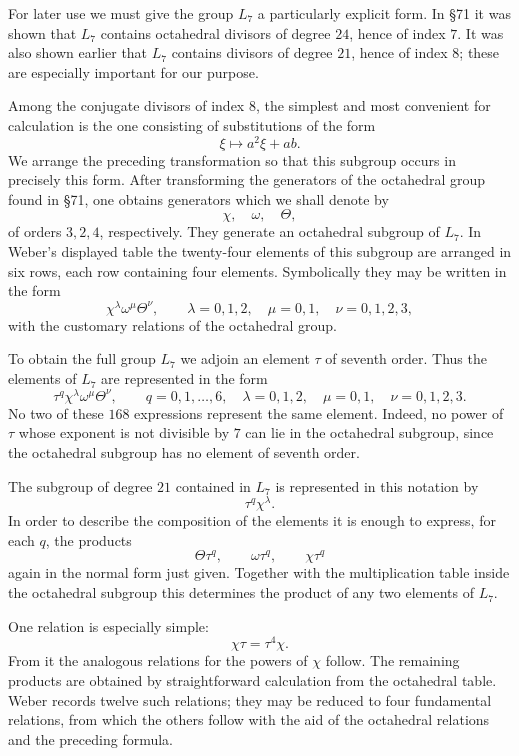 \documentclass[12pt,a4paper]{article}
\begin{document}
For later use we must give the group \(L_7\) a particularly explicit form.  In \S 71 it was shown that \(L_7\) contains octahedral divisors of degree \(24\), hence of index \(7\).  It was also shown earlier that \(L_7\) contains divisors of degree \(21\), hence of index \(8\); these are especially important for our purpose.

Among the conjugate divisors of index \(8\), the simplest and most convenient for calculation is the one consisting of substitutions of the form
\[
 \xi\longmapsto a^2\xi+ab .
\]
We arrange the preceding transformation so that this subgroup occurs in precisely this form.  After transforming the generators of the octahedral group found in \S 71, one obtains generators which we shall denote by
\[
 \chi,\quad \omega,\quad \Theta,
\]
of orders \(3,2,4\), respectively.  They generate an octahedral subgroup of \(L_7\).  In Weber's displayed table the twenty-four elements of this subgroup are arranged in six rows, each row containing four elements.  Symbolically they may be written in the form
\[
 \chi^\lambda \omega^\mu \Theta^\nu,\qquad
 \lambda=0,1,2,\quad \mu=0,1,\quad \nu=0,1,2,3,
\]
with the customary relations of the octahedral group.

To obtain the full group \(L_7\) we adjoin an element \(\tau\) of seventh order.  Thus the elements of \(L_7\) are represented in the form
\[
 \tau^q\chi^\lambda\omega^\mu\Theta^\nu,
 \qquad
 q=0,1,\ldots,6,\quad
 \lambda=0,1,2,\quad
 \mu=0,1,\quad
 \nu=0,1,2,3.
\]
No two of these \(168\) expressions represent the same element.  Indeed, no power of \(\tau\) whose exponent is not divisible by \(7\) can lie in the octahedral subgroup, since the octahedral subgroup has no element of seventh order.

The subgroup of degree \(21\) contained in \(L_7\) is represented in this notation by
\[
 \tau^q\chi^\lambda .
\]
In order to describe the composition of the elements it is enough to express, for each \(q\), the products
\[
 \Theta\tau^q,\qquad \omega\tau^q,\qquad \chi\tau^q
\]
again in the normal form just given.  Together with the multiplication table inside the octahedral subgroup this determines the product of any two elements of \(L_7\).

One relation is especially simple:
\[
 \chi\tau=\tau^4\chi.
\]
From it the analogous relations for the powers of \(\chi\) follow.  The remaining products are obtained by straightforward calculation from the octahedral table.  Weber records twelve such relations; they may be reduced to four fundamental relations, from which the others follow with the aid of the octahedral relations and the preceding formula.
\end{document}
